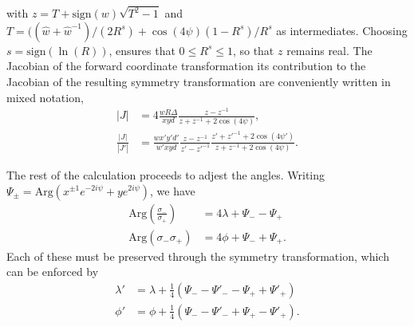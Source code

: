 \documentclass[aps,showpacs,12pt,onecolumn,prd,superscriptaddress,nofootinbib]{revtex4}
\newcommand\C{{\cos(4\psi)}}
\begin{document}
with $z=T+\mathrm{sign}(w)\sqrt{T^2-1}$ and $T=(({\hat w}+{\hat w}^{-1})/(2R^s)+\C(1-R^s)/R^s$ as intermediates.
Choosing $s=\mathrm{sign}(\ln(R))$, ensures that $0\leq R^s\leq1$, so that $z$ remains real. 
The Jacobian of the forward coordinate transformation its contribution to the Jacobian of the resulting
symmetry transformation are conveniently written in mixed notation,
\begin{align}
  |J|&=4\frac{wR\Delta}{xyd}\frac{z-z^{-1}}{z+z^{-1}+2\C},\\
  \frac{|J|}{|J'|}&=\frac{wx'y'd'}{w'xyd}\frac{z-z^{-1}}{z'-z'^{-1}}\frac{z'+z'^{-1}+2\cos(4\psi')}{z+z^{-1}+2\cos(4\psi)}.
\end{align}

The rest of the calculation proceeds to adjest the angles. Writing $\Psi_{\pm}=\mathrm{Arg}(x^{\pm1}e^{-2i\psi}+ye^{2i\psi})$,
we have
\begin{align}
  \mathrm{Arg}(\frac{\sigma_-}{\sigma_+})&=4\lambda+\Psi_--\Psi_+\\
  \mathrm{Arg}({\sigma_-}{\sigma_+})&=4\phi+\Psi_-+\Psi_+.
\end{align}
Each of these must be preserved through the symmetry transformation, which can be enforced by
\begin{align}
  \lambda'&=\lambda+\frac14(\Psi_--\Psi'_--\Psi_++\Psi'_+)\\
  \phi'&=\phi+\frac14(\Psi_--\Psi'_-+\Psi_+-\Psi'_+).
\end{align}
\end{document}
